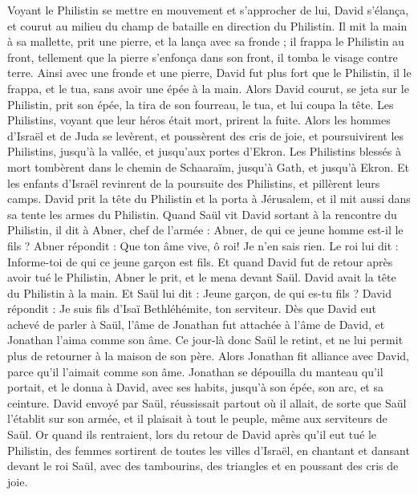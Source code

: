 \begin{multicols}{2}
Voyant le Philistin se mettre en mouvement et s'approcher de lui, David s’élança, et courut au milieu du champ de bataille en direction du Philistin.
Il mit la main à sa mallette, prit une pierre, et la lança avec sa fronde ; il frappa le Philistin au front, tellement que la pierre s'enfonça dans son front, il tomba le visage contre terre.
Ainsi avec une fronde et une pierre, David fut plus fort que le Philistin, il le frappa, et le tua, sans avoir une épée à la main.
Alors David courut, se jeta sur le Philistin, prit son épée, la tira de son fourreau, le tua, et lui coupa la tête. Les Philistins, voyant que leur héros était mort, prirent la fuite.
Alors les hommes d'Israël et de Juda se levèrent, et poussèrent des cris de joie, et poursuivirent les Philistins, jusqu'à la vallée, et jusqu'aux portes d’Ekron. Les Philistins blessés à mort tombèrent dans le chemin de Schaaraïm, jusqu'à Gath, et jusqu'à Ekron.
Et les enfants d'Israël revinrent de la poursuite des Philistins, et pillèrent leurs camps.
David prit la tête du Philistin et la porta à Jérusalem, et il mit aussi dans sa tente les armes du Philistin.
Quand Saül vit David sortant à la rencontre du Philistin, il dit à Abner, chef de l'armée : Abner, de qui ce jeune homme est-il le fils ? Abner répondit : Que ton âme vive, ô roi! Je n'en sais rien.
Le roi lui dit : Informe-toi de qui ce jeune garçon est fils.
Et quand David fut de retour après avoir tué le Philistin, Abner le prit, et le mena devant Saül. David avait la tête du Philistin à la main.
Et Saül lui dit : Jeune garçon, de qui es-tu fils ? David répondit : Je suis fils d'Isaï Bethléhémite, ton serviteur.
\VerseOne{}Dès que David eut achevé de parler à Saül, l'âme de Jonathan fut attachée à l'âme de David, et Jonathan l'aima comme son âme.
Ce jour-là donc Saül le retint, et ne lui permit plus de retourner à la maison de son père.
Alors Jonathan fit alliance avec David, parce qu'il l'aimait comme son âme.
Jonathan se dépouilla du manteau qu'il portait, et le donna à David, avec ses habits, jusqu'à son épée, son arc, et sa ceinture.
David envoyé par Saül, réussissait partout où il allait, de sorte que Saül l'établit sur son armée, et il plaisait à tout le peuple, même aux serviteurs de Saül.
Or quand ils rentraient, lors du retour de David après qu’il eut tué le Philistin, des femmes sortirent de toutes les villes d'Israël, en chantant et dansant devant le roi Saül, avec des tambourins, des triangles et en poussant des cris de joie.

\end{multicols}
